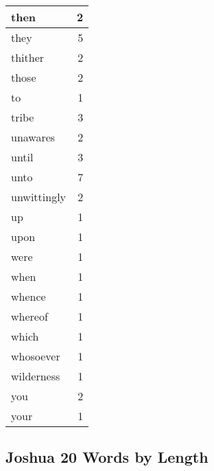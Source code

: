 \begin{center}
\begin{longtable}{l|r}
then & 2\\ \hline 
they & 5\\ \hline 
thither & 2\\ \hline 
those & 2\\ \hline 
to & 1\\ \hline 
tribe & 3\\ \hline 
unawares & 2\\ \hline 
until & 3\\ \hline 
unto & 7\\ \hline 
unwittingly & 2\\ \hline 
up & 1\\ \hline 
upon & 1\\ \hline 
were & 1\\ \hline 
when & 1\\ \hline 
whence & 1\\ \hline 
whereof & 1\\ \hline 
which & 1\\ \hline 
whosoever & 1\\ \hline 
wilderness & 1\\ \hline 
you & 2\\ \hline 
your & 1\\ \hline 
\end{longtable}
\end{center}





\subsection{Joshua 20 Words by Length}


\normalsize
 
